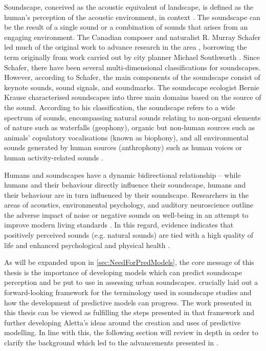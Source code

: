 Soundscape\footnotemark{}, conceived as the acoustic equivalent of landscape, is defined as the human's perception of the acoustic environment, in context \citep{ISO12913Part1}. The soundscape can be the result of a single sound or a combination of sounds that arises from an engaging environment. The Canadian composer and naturalist R. Murray Schafer led much of the original work to advance research in the area \citep{Schafer1969New}, borrowing the term originally from work carried out by city planner Michael Southworth \citep{Southworth1969sonic}. Since Schafer, there have been several multi-dimensional classifications for soundscapes. However, according to Schafer, the main components of the soundscape consist of keynote sounds, sound signals, and soundmarks. The soundscape ecologist Bernie Krause characterised soundscapes into three main domains based on the source of the sound. According to his classification, the soundscape refers to a wide spectrum of sounds, encompassing natural sounds relating to non-organi elements of nature such as waterfalls (geophony), organic but non-human sources such as animals' copulatory vocalisations (known as biophony), and all environmental sounds generated by human sources (anthrophony) such as human voices or human activity-related sounds \citep{Krause1987WholeEarth}.

Humans and soundscapes have a dynamic bidirectional relationship -- while humans and their behaviour directly influence their soundscape, humans and their behaviour are in turn influenced by their soundscape. Researchers in the areas of acoustics, environmental psychology, and auditory neuroscience outline the adverse impact of noise or negative sounds on well-being in an attempt to improve modern living standards . In this regard, evidence indicates that positively perceived sounds (e.g. natural sounds) are tied with a high quality of life and enhanced psychological and physical health .

As will be expanded upon in \cref{sec:NeedForPredModels}, the core message of this thesis is the importance of developing models which can predict soundscape perception and be put to use in assessing urban soundscapes. \citet
{Aletta2016Soundscape} crucially laid out a forward-looking framework for the terminology used in soundscape studies and how the development of predictive models can progress. The work presented in this thesis can be viewed as fulfilling the steps presented in that framework and further developing Aletta's ideas around the creation and uses of predictive modelling. In line with this, the following section will review \citet{Aletta2016Soundscape} in depth in order to clarify the background which led to the advancements presented in .

